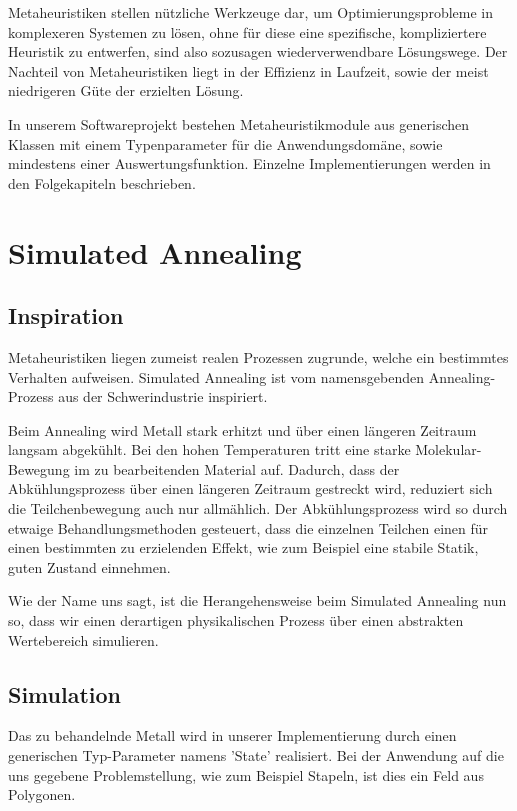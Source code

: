 \documentclass[runningheads,a4paper]{llncs}
\begin{document}
Metaheuristiken stellen nützliche Werkzeuge dar, um Optimierungsprobleme in komplexeren Systemen zu lösen, ohne für diese eine spezifische, kompliziertere Heuristik zu entwerfen, sind also sozusagen wiederverwendbare Lösungswege. Der Nachteil von Metaheuristiken liegt in der Effizienz in Laufzeit, sowie der meist niedrigeren Güte der erzielten Lösung.

In unserem Softwareprojekt bestehen Metaheuristikmodule aus generischen Klassen mit einem Typenparameter für die Anwendungsdomäne, sowie mindestens einer Auswertungsfunktion. Einzelne Implementierungen werden in den Folgekapiteln beschrieben.


\section{Simulated Annealing}

\subsection{Inspiration}

Metaheuristiken liegen zumeist realen Prozessen zugrunde, welche ein bestimmtes Verhalten aufweisen. Simulated Annealing ist vom namensgebenden Annealing-Prozess aus der Schwerindustrie inspiriert.

Beim Annealing wird  Metall stark erhitzt und über einen längeren Zeitraum langsam abgekühlt. Bei den hohen Temperaturen tritt eine starke Molekular-Bewegung im zu bearbeitenden Material auf. Dadurch, dass der Abkühlungsprozess über einen längeren Zeitraum gestreckt wird, reduziert sich die Teilchenbewegung auch nur allmählich. Der Abkühlungsprozess wird so durch etwaige Behandlungsmethoden gesteuert, dass die einzelnen Teilchen einen für einen bestimmten zu erzielenden Effekt, wie zum Beispiel eine stabile Statik, guten Zustand einnehmen.

Wie der Name uns sagt, ist die Herangehensweise beim Simulated Annealing nun so, dass wir einen derartigen physikalischen Prozess über einen abstrakten Wertebereich simulieren.

\subsection{Simulation}

Das zu behandelnde Metall wird in unserer Implementierung durch einen generischen Typ-Parameter namens 'State' realisiert. Bei der Anwendung auf die uns gegebene Problemstellung, wie zum Beispiel Stapeln, ist dies ein Feld aus Polygonen.
\end{document}
